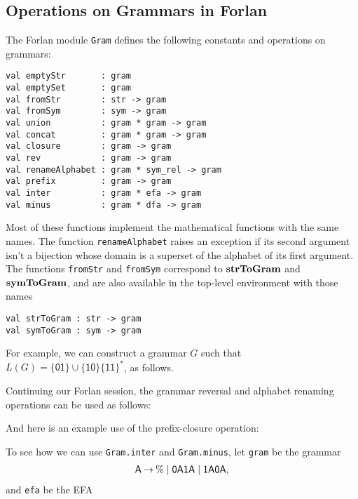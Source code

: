 \subsection{Operations on Grammars in Forlan}

The Forlan module \texttt{Gram} defines the following constants
and operations on grammars:
\begin{verbatim}
val emptyStr       : gram
val emptySet       : gram
val fromStr        : str -> gram
val fromSym        : sym -> gram
val union          : gram * gram -> gram
val concat         : gram * gram -> gram
val closure        : gram -> gram
val rev            : gram -> gram
val renameAlphabet : gram * sym_rel -> gram
val prefix         : gram -> gram
val inter          : gram * efa -> gram
val minus          : gram * dfa -> gram
\end{verbatim}
%
%
%
%
%
%
%
%
%
%
%
%
Most of these functions implement the mathematical functions with the
same names. The function \texttt{renameAlphabet} raises an exception
if its second argument isn't a bijection whose domain is a superset of
the alphabet of its first argument.  The functions \texttt{fromStr}
and \texttt{fromSym} correspond to $\mathbf{strToGram}$ and $\mathbf{symToGram}$,
and are also available in the top-level environment with those names
\begin{verbatim}
val strToGram : str -> gram
val symToGram : sym -> gram
\end{verbatim}
%
%

For example, we can construct a grammar $G$ such that
$L(G)=\mathsf{\{01\}\cup\{10\}\{11\}^*}$, as follows.

Continuing our Forlan session, the grammar reversal and alphabet
renaming operations can be used as follows:

And here is an example use of the prefix-closure operation:


To see how we can use \texttt{Gram.inter} and \texttt{Gram.minus}, let
\texttt{gram} be the grammar
\begin{gather*}
  \mathsf{A} \mathbin{\to} \% \mid \mathsf{0A1A} \mid \mathsf{1A0A} ,
\end{gather*}
and \texttt{efa} be the EFA
\begin{center}
  
\end{center}


